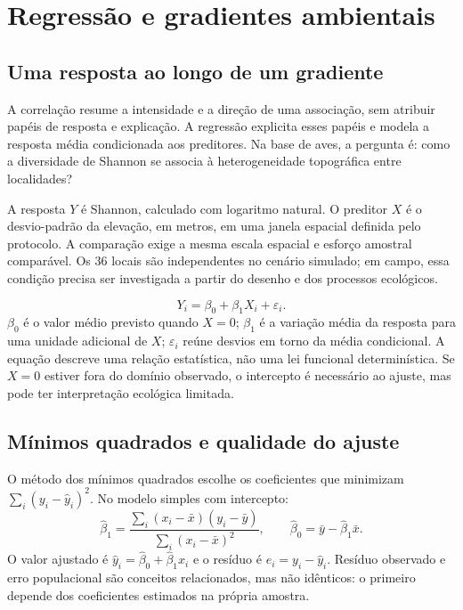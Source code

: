 \chapter{Regressão e gradientes ambientais}

\section{Uma resposta ao longo de um gradiente}
A correlação resume a intensidade e a direção de uma associação, sem atribuir papéis de resposta e explicação. A regressão explicita esses papéis e modela a resposta média condicionada aos preditores. Na base de aves, a pergunta é: como a diversidade de Shannon se associa à heterogeneidade topográfica entre localidades?

A resposta $Y$ é Shannon, calculado com logaritmo natural. O preditor $X$ é o desvio-padrão da elevação, em metros, em uma janela espacial definida pelo protocolo. A comparação exige a mesma escala espacial e esforço amostral comparável. Os 36 locais são independentes no cenário simulado; em campo, essa condição precisa ser investigada a partir do desenho e dos processos ecológicos.

\begin{equation}Y_i=\beta_0+\beta_1X_i+\varepsilon_i.\end{equation}
$\beta_0$ é o valor médio previsto quando $X=0$; $\beta_1$ é a variação média da resposta para uma unidade adicional de $X$; $\varepsilon_i$ reúne desvios em torno da média condicional. A equação descreve uma relação estatística, não uma lei funcional determinística. Se $X=0$ estiver fora do domínio observado, o intercepto é necessário ao ajuste, mas pode ter interpretação ecológica limitada.

\section{Mínimos quadrados e qualidade do ajuste}
O método dos mínimos quadrados escolhe os coeficientes que minimizam $\sum_i(y_i-\widehat y_i)^2$. No modelo simples com intercepto:
\begin{equation}\widehat\beta_1=\frac{\sum_i(x_i-\bar x)(y_i-\bar y)}
{\sum_i(x_i-\bar x)^2},\qquad
\widehat\beta_0=\bar y-\widehat\beta_1\bar x.\end{equation}
O valor ajustado é $\widehat y_i=\widehat\beta_0+\widehat\beta_1x_i$ e o resíduo é $e_i=y_i-\widehat y_i$. Resíduo observado e erro populacional são conceitos relacionados, mas não idênticos: o primeiro depende dos coeficientes estimados na própria amostra.

